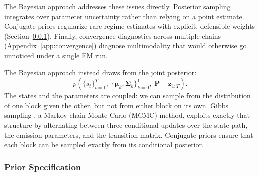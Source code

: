 The Bayesian approach addresses these issues directly. Posterior sampling integrates over parameter uncertainty rather than relying on a point estimate. Conjugate priors regularize rare-regime estimates with explicit, defensible weights (Section~\ref{sec:priors}). Finally, convergence diagnostics across multiple chains (Appendix~\ref{app:convergence}) diagnose multimodality that would otherwise go unnoticed under a single EM run.

The Bayesian approach instead draws from the joint posterior:
\[
p\!\left(\{s_t\}_{t=1}^T,\; \{\boldsymbol{\mu}_k,\boldsymbol{\Sigma}_k\}_{k=0}^1,\; \mathbf{P} \,\middle|\, \mathbf{z}_{1:T}\right).
\]
 The states and the parameters are coupled: we can sample from the distribution of one block given the other, but not from either block on its own. Gibbs sampling \citep{AlbertChib1993, Hoff2009}, a Markov chain Monte Carlo (MCMC) method, exploits exactly that structure by alternating between three conditional updates over the state path, the emission parameters, and the transition matrix. Conjugate priors ensure that each block can be sampled exactly from its conditional posterior.

\subsubsection{Prior Specification}\label{sec:priors}


